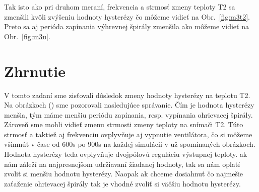 \documentclass{article}
\begin{document}
Tak isto ako pri druhom meraní, frekvencia a strmosť zmeny teploty T2 sa zmenšili kvôli zvýšeniu hodnoty hysterézy čo môžeme vidieť na Obr.~\ref{fig:m3t2}. Preto sa aj perióda zapínania výhrevnej špirály zmenšila ako môžeme vidieť na Obr.~\ref{fig:m3u}.

\section{Zhrnutie}
\label{sec:zhrnutie}

V tomto zadaní sme zisťovali dôsledok zmeny hodnoty hysterézy na teplotu T2. Na obrázkoch () sme pozorovali nasledujúce správanie. Čím je hodnota hysterézy menšia, tým máme menšiu periódu zapínania, resp. vypínania ohrievacej špirály. Zároveň sme mohli vidieť zmenu strmosti zmeny teploty na snímači T2. Túto strmosť a taktiež aj frekvenciu ovplyvňuje aj vypnutie ventilátora, čo si môžeme všimnút v čase od 600s po 900s na každej simulácii v už spomínaných obrázkoch. Hodnota hysterézy teda ovplyvňuje dvojpólovú reguláciu výstupnej teploty. ak nám záleží na najpresnejšom udržiavaní žiadanej hodnoty, tak sa nám oplatí zvoliť si menšiu hodnotu hysterézy. Naopak ak chceme dosiahnuť čo najmešie zaťaženie ohrievacej špirály tak je vhodné zvoliť si väčšiu hodnotu hysterézy.
\end{document}
